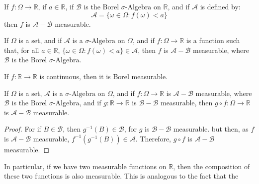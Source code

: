         \begin{theorem}
            If $f:\Omega\rightarrow\mathbb{R}$, if $a\in\mathbb{R}$,
            if $\mathcal{B}$ is the Borel $\sigma\text{-Algebra}$ on
            $\mathbb{R}$, and if $\mathcal{A}$ is defined by:
            \begin{equation}
                \mathcal{A}=\{\omega\in\Omega:f(\omega)<a\}
            \end{equation}
            then $f$ is $\mathcal{A}-\mathcal{B}$ measurable.
        \end{theorem}
        \begin{theorem}
            If $\Omega$ is a set, and if $\mathcal{A}$ is a
            $\sigma\text{-Algebra}$ on $\Omega$, and if
            $f:\Omega\rightarrow\mathbb{R}$ is a function such that,
            for all $a\in\mathbb{R}$,
            $\{\omega\in\Omega:f(\omega)<a\}\in\mathcal{A}$, then
            $f$ is $\mathcal{A}-\mathcal{B}$ measurable, where
            $\mathcal{B}$ is the Borel $\sigma\text{-Algebra}$.
        \end{theorem}
        \begin{theorem}
            If $f:\mathbb{R}\rightarrow\mathbb{R}$ is continuous,
            then it is Borel measurable.
        \end{theorem}
        \begin{theorem}
            If $\Omega$ is a set, $\mathcal{A}$ is a
            $\sigma\text{-Algebra}$ on $\Omega$, and if
            $f:\Omega\rightarrow\mathbb{R}$ is
            $\mathcal{A}-\mathcal{B}$ measurable, where
            $\mathcal{B}$ is the Borel $\sigma\text{-Algebra}$, and
            if $g:\mathbb{R}\rightarrow\mathbb{R}$ is
            $\mathcal{B}-\mathcal{B}$ measurable, then
            $g\circ{f}:\Omega\rightarrow\mathbb{R}$ is
            $\mathcal{A}-\mathcal{B}$ measurable.
        \end{theorem}
        \begin{proof}
            For if $B\in\mathcal{B}$, then
            $g^{-1}(B)\in\mathcal{B}$, for $g$ is
            $\mathcal{B}-\mathcal{B}$ measurable. but then,
            as $f$ is $\mathcal{A}-\mathcal{B}$ measurable,
            $f^{-1}(g^{-1}(B))\in\mathcal{A}$. Therefore,
            $g\circ{f}$ is $\mathcal{A}-\mathcal{B}$ measurable.
        \end{proof}
        In particular, if we have two measurable functions on
        $\mathbb{R}$, then the composition of these two functions
        is also measurable. This is analogous to the fact that the
